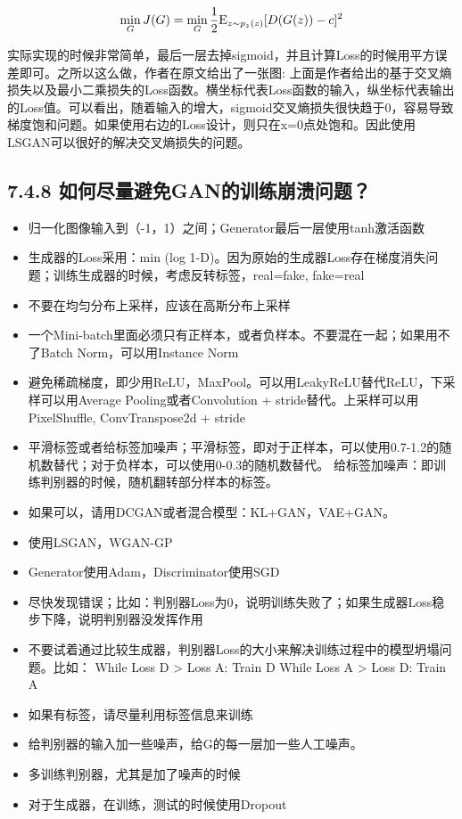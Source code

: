 \[
\mathop{\min }\limits_GJ(G)=\mathop{\min}\limits_G{\frac{1}{2}}{\rm E}_{z\sim{p_z}(z)}[D(G(z))-c]^2
\]

​
实际实现的时候非常简单，最后一层去掉sigmoid，并且计算Loss的时候用平方误差即可。之所以这么做，作者在原文给出了一张图:
上面是作者给出的基于交叉熵损失以及最小二乘损失的Loss函数。横坐标代表Loss函数的输入，纵坐标代表输出的Loss值。可以看出，随着输入的增大，sigmoid交叉熵损失很快趋于0，容易导致梯度饱和问题。如果使用右边的Loss设计，则只在x=0点处饱和。因此使用LSGAN可以很好的解决交叉熵损失的问题。

\subsection{7.4.8
如何尽量避免GAN的训练崩溃问题？}\label{ux5982ux4f55ux5c3dux91cfux907fux514dganux7684ux8badux7ec3ux5d29ux6e83ux95eeux9898}

\begin{itemize}
\item
  归一化图像输入到（-1，1）之间；Generator最后一层使用tanh激活函数
\item
  生成器的Loss采用：min (log
  1-D)。因为原始的生成器Loss存在梯度消失问题；训练生成器的时候，考虑反转标签，real=fake,
  fake=real
\item
  不要在均匀分布上采样，应该在高斯分布上采样
\item
  一个Mini-batch里面必须只有正样本，或者负样本。不要混在一起；如果用不了Batch
  Norm，可以用Instance Norm
\item
  避免稀疏梯度，即少用ReLU，MaxPool。可以用LeakyReLU替代ReLU，下采样可以用Average
  Pooling或者Convolution + stride替代。上采样可以用PixelShuffle,
  ConvTranspose2d + stride
\item
  平滑标签或者给标签加噪声；平滑标签，即对于正样本，可以使用0.7-1.2的随机数替代；对于负样本，可以使用0-0.3的随机数替代。
  给标签加噪声：即训练判别器的时候，随机翻转部分样本的标签。
\item
  如果可以，请用DCGAN或者混合模型：KL+GAN，VAE+GAN。
\item
  使用LSGAN，WGAN-GP
\item
  Generator使用Adam，Discriminator使用SGD
\item
  尽快发现错误；比如：判别器Loss为0，说明训练失败了；如果生成器Loss稳步下降，说明判别器没发挥作用
\item
  不要试着通过比较生成器，判别器Loss的大小来解决训练过程中的模型坍塌问题。比如：
  While Loss D \textgreater{} Loss A: Train D While Loss A
  \textgreater{} Loss D: Train A
\item
  如果有标签，请尽量利用标签信息来训练
\item
  给判别器的输入加一些噪声，给G的每一层加一些人工噪声。
\item
  多训练判别器，尤其是加了噪声的时候
\item
  对于生成器，在训练，测试的时候使用Dropout
\end{itemize}

